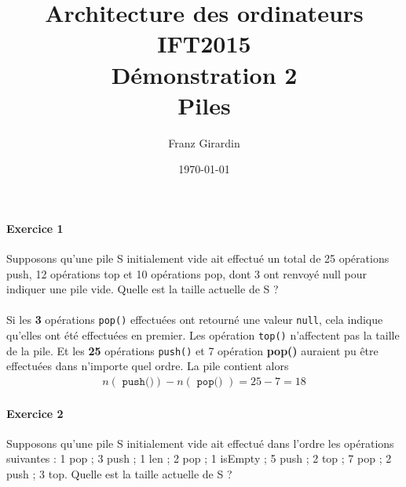 \documentclass{report}
\title{\Huge{Architecture des ordinateurs}\\{IFT2015}\\{Démonstration 2}\\{\textbf{Piles}}}
\author{\huge{Franz Girardin}}
\date{\today}
\begin{document}
\maketitle

\pagebreak

\pagebreak
\begin{multicols*}{3}
  

  \footnotesize


  \paragraph{Exercice 1}  
  Supposons qu'une pile S initialement vide ait effectué 
  un   total de 25
  opérations push, 12 opérations top et 10 opérations 
  pop, dont 3 ont renvoyé null pour indiquer une 
  pile vide. Quelle est la taille actuelle de S ?

  \paragraph{} 
  Si les \textbf{3} opérations \texttt{pop()} effectuées
  ont retourné une valeur \texttt{null}, cela indique 
  qu'elles ont été effectuées en premier. Les 
  opération \texttt{top()} n'affectent pas la taille 
  de la pile. Et les \textbf{25} opérations 
  \texttt{push()} et 7 opération \textbf{pop()}
  auraient pu être effectuées dans n'importe quel 
  ordre. La pile contient alors 
  \begin{align*}
        n(\texttt{ push()}  ) - n(\texttt{ pop() }  )
        = 25 - 7 = 18
  \end{align*}

  \paragraph{Exercice 2}


  Supposons qu'une pile S initialement vide ait effectué 
  dans l’ordre les opérations suivantes : 
  1 pop ; 3 push ; 1 len ; 2 pop ; 1 isEmpty ; 5 push ; 
  2 top ; 7 pop ; 2 push ; 3 top. Quelle est la taille
  actuelle de S ?



  \begin{table}[H]
    \caption {}


\end{table}
\end{multicols*}
\end{document}
